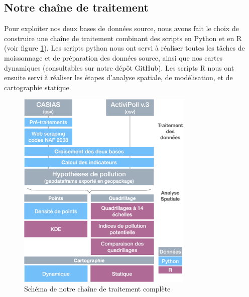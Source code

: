 \documentclass[a4paper,twoside,12pt]{book}
\begin{document}
\subsection{Notre chaîne de traitement}

Pour exploiter nos deux bases de données source, nous avons fait le choix de construire une chaîne de traitement combinant des scripts en Python et en R (voir figure \ref{fig:pipeline}). Les scripts python nous ont servi à réaliser toutes les tâches de moissonnage et de préparation des données source, ainsi que nos cartes dynamiques (consultables sur notre dépôt GitHub). Les scripts R nous ont ensuite servi à réaliser les étapes d’analyse spatiale, de modélisation, et de cartographie statique. 

\begin{figure}[!h]
\centering 
\includegraphics[width=0.75\textwidth]{img/chapitre3/schema_pipeline_all.png}
\caption{Schéma de notre chaîne de traitement complète}
\label{fig:pipeline}
\end{figure}
\end{document}
